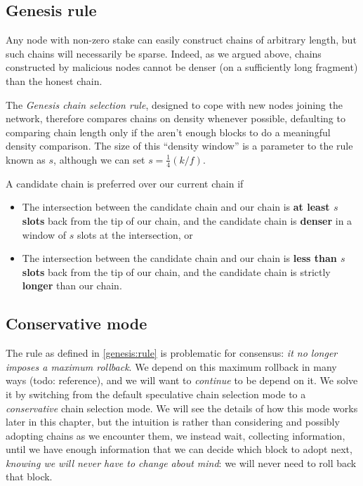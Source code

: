 \subsection{Genesis rule}

Any node with non-zero stake can easily construct chains of arbitrary length,
but such chains will necessarily be sparse. Indeed, as we argued above,
chains constructed by malicious nodes cannot be denser (on a sufficiently
long fragment) than the honest chain.

The \emph{Genesis chain selection rule}, designed to cope with new nodes joining
the network, therefore compares chains on density whenever possible, defaulting
to comparing chain length only if the aren't enough blocks to do a meaningful
density comparison. The size of this ``density window'' is a parameter to the
rule known as $s$, although we can set $s = \frac{1}{4}(k / f)$.

\begin{definition}
\label{genesis:rule}
A candidate chain is preferred over our current chain if

\begin{itemize}
\item The intersection between the candidate chain and our chain is \textbf{at
least $s$ slots} back from the tip of our chain, and the candidate chain is
\textbf{denser} in a window of $s$ slots at the intersection, or

\item The intersection between the candidate chain and our chain is \textbf{less
than $s$ slots} back from the tip of our chain, and the candidate chain is
strictly \textbf{longer} than our chain.
\end{itemize}

\end{definition}

\subsection{Conservative mode}

The rule as defined in \cref{genesis:rule} is problematic for consensus:
\emph{it no longer imposes a maximum rollback}. We depend on this maximum
rollback in many ways (todo: reference), and we will want to \emph{continue}
to be depend on it. We solve it by switching from the default
speculative chain selection mode to a \emph{conservative} chain selection mode.
We will see the details of how this mode works later in this chapter, but
the intuition is rather than considering and possibly adopting chains as we
encounter them, we instead wait, collecting information, until we have enough
information that we can decide which block to adopt next, \emph{knowing we will
never have to change about mind}: we will never need to roll back that block.

